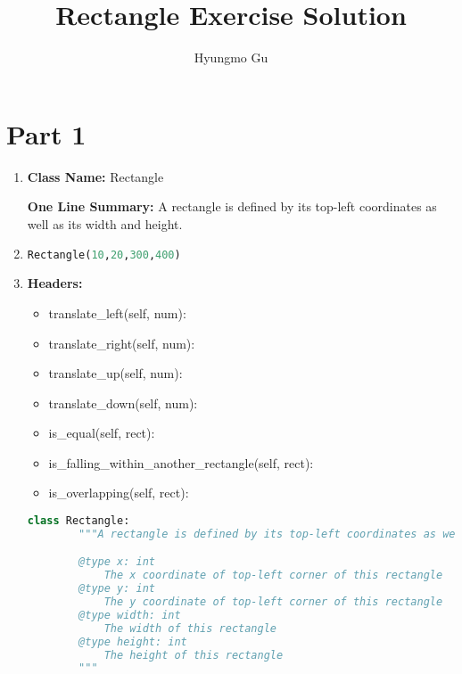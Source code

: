 \documentclass[12pt]{article}
\begin{document}
\title{Rectangle Exercise Solution}
\author{Hyungmo Gu}
\maketitle

\section*{Part 1}
\begin{enumerate}
    \item

    \textbf{Class Name:} Rectangle

    \bigskip

    \textbf{One Line Summary:} A rectangle is defined by its top-left coordinates
    as well as its width and height.

    \item

    \begin{lstlisting}[language=Python]
    Rectangle(10,20,300,400)
    \end{lstlisting}

    \item

    \textbf{Headers:}

    \bigskip

    \begin{itemize}
        \item translate\_left(self, num):
        \item translate\_right(self, num):
        \item translate\_up(self, num):
        \item translate\_down(self, num):
        \item is\_equal(self, rect):
        \item is\_falling\_within\_another\_rectangle(self, rect):
        \item is\_overlapping(self, rect):
    \end{itemize}

    \begin{lstlisting}[language=Python]
    class Rectangle:
        """A rectangle is defined by its top-left coordinates as well as its width and height.

        @type x: int
            The x coordinate of top-left corner of this rectangle
        @type y: int
            The y coordinate of top-left corner of this rectangle
        @type width: int
            The width of this rectangle
        @type height: int
            The height of this rectangle
        """


\end{lstlisting}
\end{enumerate}
\end{document}
